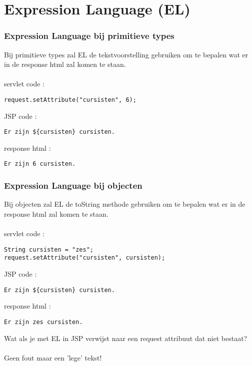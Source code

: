 \documentclass{beamer}
\begin{document}
\section{Expression Language (EL)}

\begin{frame}[fragile]

\frametitle{Expression Language bij primitieve types}

Bij primitieve types zal EL de tekstvoorstelling gebruiken om te bepalen wat er in
de response html zal komen te staan.\\~\\
servlet code :
\begin{verbatim}
request.setAttribute("cursisten", 6);
\end{verbatim}
JSP code :
\begin{verbatim}
Er zijn ${cursisten} cursisten.
\end{verbatim}
response html :
\begin{verbatim}
Er zijn 6 cursisten.
\end{verbatim}

\end{frame}


\begin{frame}[fragile]

\frametitle{Expression Language bij objecten}

Bij objecten zal EL de toString methode gebruiken om te bepalen wat er in
de response html zal komen te staan.\\~\\

servlet code :
\begin{verbatim}
String cursisten = "zes";
request.setAttribute("cursisten", cursisten);
\end{verbatim}
JSP code :
\begin{verbatim}
Er zijn ${cursisten} cursisten.
\end{verbatim}
response html :
\begin{verbatim}
Er zijn zes cursisten.
\end{verbatim}

\end{frame}


\begin{frame}

{\Large Wat als je met EL in JSP verwijst naar een request attribuut dat niet bestaat?\\~\\
Geen fout maar een 'lege' tekst!}

\end{frame}
\end{document}
